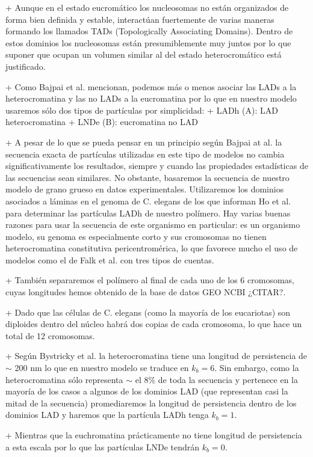 + Aunque en el estado eucromático los nucleosomas no están organizados de forma bien definida y estable, interactúan fuertemente de varias maneras formando los llamados TADs (Topologically Associating Domains). Dentro de estos dominios los nucleosomas están presumiblemente muy juntos por lo que suponer que ocupan un volumen similar al del estado heterocromático está justificado.

+ Como Bajpai et al. mencionan, podemos más o menos asociar las LADs a la heterocromatina y las no LADs a la eucromatina por lo que en nuestro modelo usaremos sólo dos tipos de partículas por simplicidad:
+ LADh (A): LAD heterocromatina
+ LNDe (B): eucromatina no LAD

+ A pesar de lo que se pueda pensar en un principio según Bajpai at al. la secuencia exacta de partículas utilizadas en este tipo de modelos no cambia significativamente los resultados, siempre y cuando las propiedades estadísticas de las secuencias sean similares. No obstante, basaremos la secuencia de nuestro modelo de grano grueso en datos experimentales. Utilizaremos los dominios asociados a láminas en el genoma de C. elegans de los que informan Ho et al. para determinar las partículas LADh de nuestro polímero. Hay varias buenas razones para usar la secuencia de este organismo en particular: es un organismo modelo, su genoma es especialmente corto y sus cromosomas no tienen heterocromatina constitutiva pericentromérica, lo que favorece mucho el uso de modelos como el de Falk et al. con tres tipos de cuentas.

+ También separaremos el polímero al final de cada uno de los 6 cromosomas, cuyas longitudes hemos obtenido de la base de datos GEO NCBI ¿CITAR?.

+ Dado que las células de C. elegans (como la mayoría de los eucariotas) son diploides dentro del núcleo habrá dos copias de cada cromosoma, lo que hace un total de 12 cromosomas.

+ Según Bystricky et al. la heterocromatina tiene una longitud de persistencia de $\sim$ 200 nm lo que en nuestro modelo se traduce en $k_b=6$. Sin embargo, como la heterocromatina sólo representa $\sim$ el 8\% de toda la secuencia y pertenece en la mayoría de los casos a algunos de los dominios LAD (que representan casi la mitad de la secuencia) promediaremos la longitud de persistencia dentro de los dominios LAD y haremos que la partícula LADh tenga $k_b=1$.

+ Mientras que la euchromatina prácticamente no tiene longitud de persistencia a esta escala por lo que las partículas LNDe tendrán $k_b=0$.


